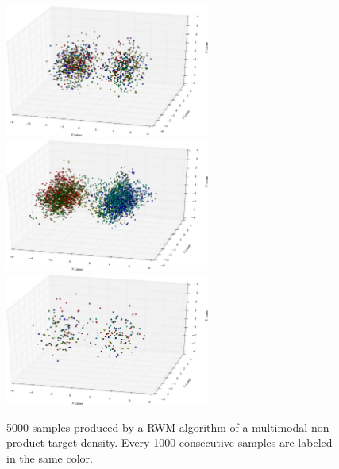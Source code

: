 \begin{figure}%
 \begin{center} 
  \includegraphics[width=0.6\textwidth]{figure_1}
  \vspace*{1mm}
  \label{fig:3DscatterplotRWM-optimal}
  \vspace*{3mm}
  \includegraphics[width=0.6\textwidth]{figure_2}
  \vspace*{1mm}
  \vspace*{3mm}
  \includegraphics[width=0.6\textwidth]{figure_3}
  \vspace*{1mm}
 \end{center}
  \caption{5000 samples produced by a RWM algorithm of a multimodal non-product target density. Every 1000 consecutive samples are labeled in the same color.}
  \label{fig:3DscatterplotRWM}
\end{figure}

